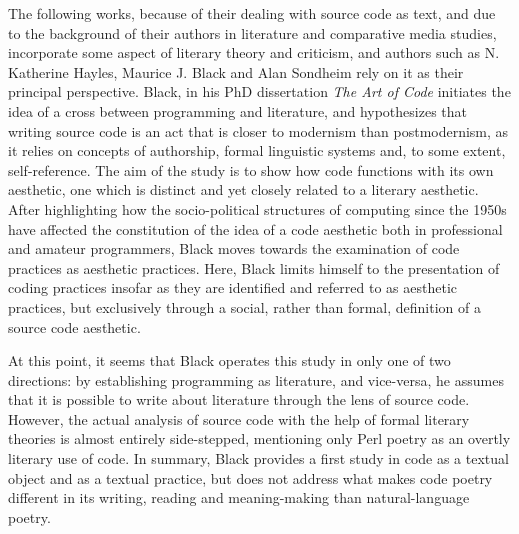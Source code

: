 The following works, because of their dealing with source code as text, and due to the background of their authors in literature and comparative media studies, incorporate some aspect of literary theory and criticism, and authors such as N. Katherine Hayles, Maurice J. Black and Alan Sondheim rely on it as their principal perspective. Black, in his PhD dissertation \emph{The Art of Code}\cite{black_art_2002} initiates the idea of a cross between programming and literature, and hypothesizes that writing source code is an act that is closer to modernism than postmodernism, as it relies on concepts of authorship, formal linguistic systems and, to some extent, self-reference. The aim of the study is to show how code functions with its own aesthetic, one which is distinct and yet closely related to a literary aesthetic. After highlighting how the socio-political structures of computing since the 1950s have affected the constitution of the idea of a code aesthetic both in professional and amateur programmers, Black moves towards the examination of code practices as aesthetic practices. Here, Black limits himself to the presentation of coding practices insofar as they are identified and referred to as aesthetic practices, but exclusively through a social, rather than formal, definition of a source code aesthetic.

At this point, it seems that Black operates this study in only one of two directions: by establishing programming as literature, and vice-versa, he assumes that it is possible to write about literature through the lens of source code. However, the actual analysis of source code with the help of formal literary theories is almost entirely side-stepped, mentioning only Perl poetry as an overtly literary use of code. In summary, Black provides a first study in code as a textual object and as a textual practice, but does not address what makes code poetry different in its writing, reading and meaning-making than natural-language poetry.

